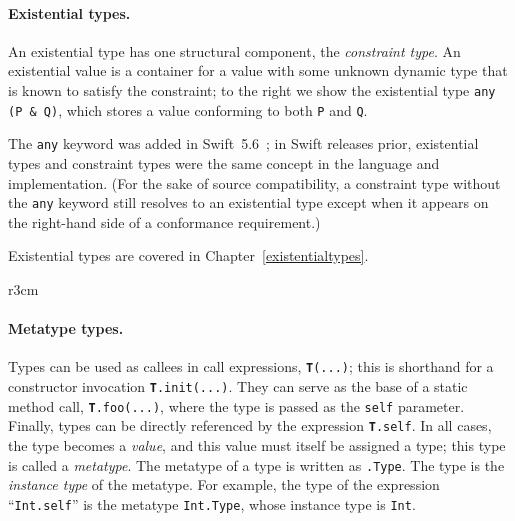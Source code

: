 \documentclass[../generics]{subfiles}
\begin{document}
\paragraph{Existential types.}
An existential type has one structural component, the \emph{constraint type}. An existential value is a container for a value with some unknown dynamic type that is known to satisfy the constraint; to the right we show the existential type \verb|any (P & Q)|, which stores a value conforming to both \texttt{P} and \texttt{Q}.

The \texttt{any} keyword was added in Swift~5.6~\cite{se0355}; in Swift releases prior, existential types and constraint types were the same concept in the language and implementation. (For the sake of source compatibility, a constraint type without the \texttt{any} keyword still resolves to an existential type except when it appears on the right-hand side of a conformance requirement.)

Existential types are covered in Chapter~\ref{existentialtypes}.

\begin{wrapfigure}[9]{r}{3cm}
\end{wrapfigure}

\paragraph{Metatype types.} Types can be used as callees in call expressions, \texttt{\textbf{T}(...)}; this is shorthand for a constructor invocation \texttt{\textbf{T}.init(...)}. They can serve as the base of a static method call, \texttt{\textbf{T}.foo(...)}, where the type is passed as the \texttt{self} parameter. Finally, types can be directly referenced by the expression \texttt{\textbf{T}.self}. In all cases, the type becomes a \emph{value}, and this value must itself be assigned a type; this type is called a \emph{metatype}. The metatype of a type  is written as \texttt{.Type}. The type  is the \emph{instance type} of the metatype. For example, the type of the expression ``\verb|Int.self|'' is the metatype \texttt{Int.Type}, whose instance type is \verb|Int|.
\end{document}
